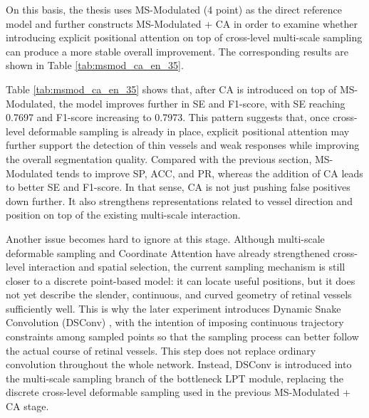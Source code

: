 \documentclass[a4paper,11pt]{article}
\begin{document}
On this basis, the thesis uses MS-Modulated (4 point) as the direct reference model and further constructs MS-Modulated + CA in order to examine whether introducing explicit positional attention on top of cross-level multi-scale sampling can produce a more stable overall improvement. The corresponding results are shown in Table \ref{tab:msmod_ca_en_35}.

\begin{table}[!htbp]
\centering
\caption{Comparison between MS-Modulated and MS-Modulated + CA}
\label{tab:msmod_ca_en_35}
\end{table}

Table \ref{tab:msmod_ca_en_35} shows that, after CA is introduced on top of MS-Modulated, the model improves further in SE and F1-score, with SE reaching 0.7697 and F1-score increasing to 0.7973. This pattern suggests that, once cross-level deformable sampling is already in place, explicit positional attention may further support the detection of thin vessels and weak responses while improving the overall segmentation quality. Compared with the previous section, MS-Modulated tends to improve SP, ACC, and PR, whereas the addition of CA leads to better SE and F1-score. In that sense, CA is not just pushing false positives down further. It also strengthens representations related to vessel direction and position on top of the existing multi-scale interaction.

Another issue becomes hard to ignore at this stage. Although multi-scale deformable sampling and Coordinate Attention have already strengthened cross-level interaction and spatial selection, the current sampling mechanism is still closer to a discrete point-based model: it can locate useful positions, but it does not yet describe the slender, continuous, and curved geometry of retinal vessels sufficiently well. This is why the later experiment introduces Dynamic Snake Convolution (DSConv) \cite{qi2023dsc}, with the intention of imposing continuous trajectory constraints among sampled points so that the sampling process can better follow the actual course of retinal vessels. This step does not replace ordinary convolution throughout the whole network. Instead, DSConv is introduced into the multi-scale sampling branch of the bottleneck LPT module, replacing the discrete cross-level deformable sampling used in the previous MS-Modulated + CA stage.
\end{document}
